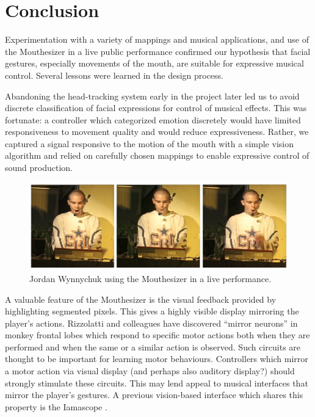 \section{Conclusion}

Experimentation with a variety of mappings and musical applications, and use of the Mouthesizer in a live public performance confirmed our hypothesis that facial gestures, especially movements of the mouth, are suitable for expressive musical control. Several lessons were learned in the design process.

Abandoning the head-tracking system early in the project later led us to avoid discrete classification of facial expressions for control of musical effects. This was fortunate: a controller which categorized emotion discretely would have limited responsiveness to movement quality and would reduce expressiveness. Rather, we captured a signal responsive to the motion of the mouth with a simple vision algorithm and relied on carefully chosen mappings to enable expressive control of sound production.

\begin{figure}[t]
\centering
\includegraphics[width=\textwidth]{lyons_fig7}
\caption{Jordan Wynnychuk using the Mouthesizer in a live performance.}
\label{lyons-fig:7} 
\end{figure}

A valuable feature of the Mouthesizer is the visual feedback provided by highlighting segmented pixels. This gives a highly visible display mirroring the player's actions. Rizzolatti and colleagues \cite{Rizzolatti:1996} have discovered ``mirror neurons'' in monkey frontal lobes which respond to specific motor actions both when they are performed and when the same or a similar action is observed. Such circuits are thought to be important for learning motor behaviours. Controllers which mirror a motor action via visual display (and perhaps also auditory display?) should strongly stimulate these circuits. This may lend appeal to musical interfaces that mirror the player's gestures. A previous vision-based interface which shares this property is the Iamascope \cite{Fels:1999}. 

